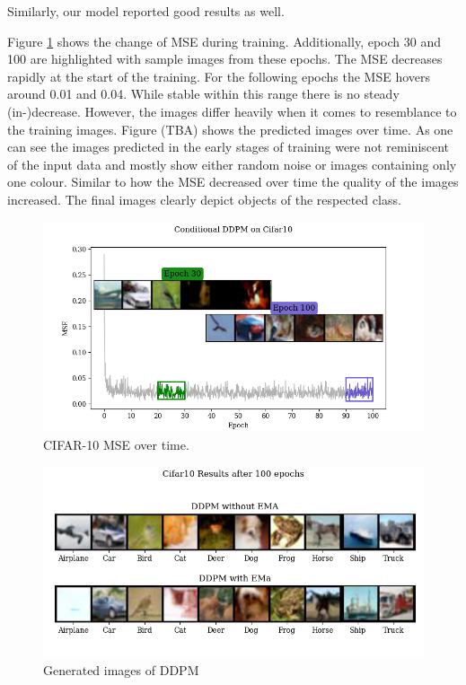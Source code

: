 \documentclass[12pt]{article}
\theoremstyle{plain}
\theoremstyle{definition}
\theoremstyle{remark}
\begin{document}
Similarly, our model reported good results as well. 

Figure \ref{fig:cifar10msewithpredictions} shows the change of \ac{MSE} during training. Additionally, epoch 30 and 100 are highlighted with sample images from these epochs. The \ac{MSE} decreases rapidly at the start of the training. For the following epochs the \ac{MSE} hovers around 0.01 and 0.04. While stable within this range there is no steady (in-)decrease. However, the images differ heavily when it comes to resemblance to the training images. 
Figure (TBA) shows the predicted images over time. As one can see the images predicted in the early stages of training were not reminiscent of the input data and mostly show either random noise or images containing only one colour. Similar to how the \ac{MSE} decreased over time the quality of the images increased. The final images clearly depict objects of the respected class. 

\begin{figure}[H]
	\centering
	\includegraphics[width=\linewidth]{src/Images/cifar10_mse_with_predictions}
	\caption[\ac{CIFAR-10} \ac{MSE} over time.]{\ac{CIFAR-10} \ac{MSE} over time.}
	\label{fig:cifar10msewithpredictions}
\end{figure}


\begin{figure}[H]
	\centering
	\includegraphics[width=1\linewidth]{src/Images/cifar10_results}
	\caption[Generated \ac{CIFAR-10} images of \ac{DDPM}]{Generated images of \ac{DDPM}}
\label{fig:cifar10results}
\end{figure}
\end{document}
